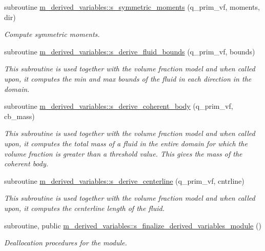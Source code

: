 \begin{DoxyCompactItemize}
subroutine \hyperlink{namespacem__derived__variables_ade52fa354cc5b681c4d6ef6fc8b2c61b}{m\+\_\+derived\+\_\+variables\+::s\+\_\+symmetric\+\_\+moments} (q\+\_\+prim\+\_\+vf, moments, dir)
\begin{DoxyCompactList}\small\item\em Compute symmetric moments. \end{DoxyCompactList}\item 
subroutine \hyperlink{namespacem__derived__variables_abdf1859a7ad678848feb69bbe89a2f95}{m\+\_\+derived\+\_\+variables\+::s\+\_\+derive\+\_\+fluid\+\_\+bounds} (q\+\_\+prim\+\_\+vf, bounds)
\begin{DoxyCompactList}\small\item\em This subroutine is used together with the volume fraction model and when called upon, it computes the min and max bounds of the fluid in each direction in the domain. \end{DoxyCompactList}\item 
subroutine \hyperlink{namespacem__derived__variables_a2472e46739cdedf315aefa209a08f211}{m\+\_\+derived\+\_\+variables\+::s\+\_\+derive\+\_\+coherent\+\_\+body} (q\+\_\+prim\+\_\+vf, cb\+\_\+mass)
\begin{DoxyCompactList}\small\item\em This subroutine is used together with the volume fraction model and when called upon, it computes the total mass of a fluid in the entire domain for which the volume fraction is greater than a threshold value. This gives the mass of the coherent body. \end{DoxyCompactList}\item 
subroutine \hyperlink{namespacem__derived__variables_a976bfd341efaba6840dc23d6abc4f29e}{m\+\_\+derived\+\_\+variables\+::s\+\_\+derive\+\_\+centerline} (q\+\_\+prim\+\_\+vf, cntrline)
\begin{DoxyCompactList}\small\item\em This subroutine is used together with the volume fraction model and when called upon, it computes the centerline length of the fluid. \end{DoxyCompactList}\item 
subroutine, public \hyperlink{namespacem__derived__variables_a735665bf598281689158d9d6e075f3d4}{m\+\_\+derived\+\_\+variables\+::s\+\_\+finalize\+\_\+derived\+\_\+variables\+\_\+module} ()
\begin{DoxyCompactList}\small\item\em Deallocation procedures for the module. \end{DoxyCompactList}\end{DoxyCompactItemize}
